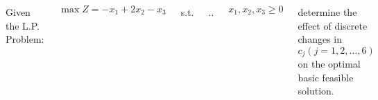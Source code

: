 \begin{frameExample}{}{}

      \begin{columns}
    Given the L.P. Problem:

    $\max Z = -x_1 + 2x_2 - x_3$

    
    s.t.

    \vspace{5mm}
    \sysdelim..%

    \vspace{5mm}

    $x_1,x_2,x_3 \geq 0$

    determine the effect of discrete changes in $c_j (j = 1,2,\ldots,6)$ on the optimal basic feasible solution.
  \end{columns}

\end{frameExample}


